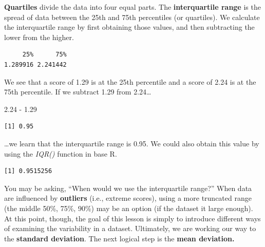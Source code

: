 \documentclass[
  11pt,
]{book}
\newenvironment{Shaded}{\begin{snugshade}}{\end{snugshade}}
\newcommand{\AttributeTok}[1]{\textcolor[rgb]{0.77,0.63,0.00}{#1}}
\newcommand{\ConstantTok}[1]{\textcolor[rgb]{0.00,0.00,0.00}{#1}}
\newcommand{\FloatTok}[1]{\textcolor[rgb]{0.00,0.00,0.81}{#1}}
\newcommand{\FunctionTok}[1]{\textcolor[rgb]{0.00,0.00,0.00}{#1}}
\newcommand{\NormalTok}[1]{#1}
\newcommand{\SpecialCharTok}[1]{\textcolor[rgb]{0.00,0.00,0.00}{#1}}
\begin{document}
\textbf{Quartiles} divide the data into four equal parts. The \textbf{interquartile range} is the spread of data between the 25th and 75th percentiles (or quartiles). We calculate the interquartile range by first obtaining those values, and then subtracting the lower from the higher.

\begin{Shaded}
\end{Shaded}

\begin{verbatim}
     25%      75% 
1.289916 2.241442 
\end{verbatim}

We see that a score of 1.29 is at the 25th percentile and a score of 2.24 is at the 75th percentile. If we subtract 1.29 from 2.24\ldots{}

\begin{Shaded}
\begin{Highlighting}[]
\FloatTok{2.24} \SpecialCharTok{{-}} \FloatTok{1.29}
\end{Highlighting}
\end{Shaded}

\begin{verbatim}
[1] 0.95
\end{verbatim}

\ldots we learn that the interquartile range is 0.95. We could also obtain this value by using the \emph{IQR()} function in base R.

\begin{Shaded}
\end{Shaded}

\begin{verbatim}
[1] 0.9515256
\end{verbatim}

You may be asking, ``When would we use the interquartile range?'' When data are influenced by \textbf{outliers} (i.e., extreme scores), using a more truncated range (the middle 50\%, 75\%, 90\%) may be an option (if the dataset it large enough). At this point, though, the goal of this lesson is simply to introduce different ways of examining the variability in a dataset. Ultimately, we are working our way to the \textbf{standard deviation}. The next logical step is the \textbf{mean deviation.}
\end{document}
